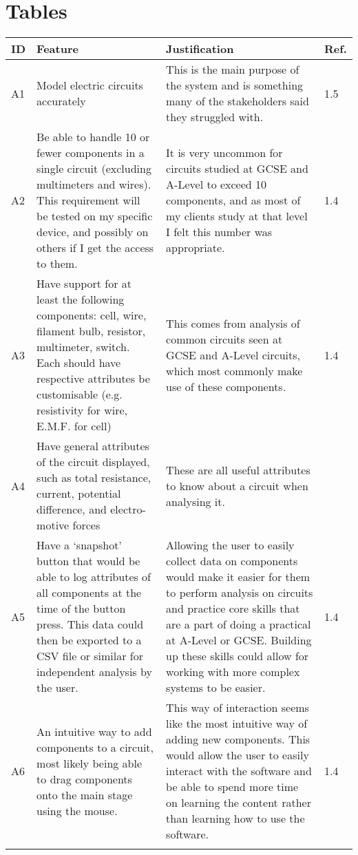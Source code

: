 \chapter{Tables}

\begin{table}[!ht]
    \centering
    \footnotesize
    \begin{tabular}{@{}lp{185pt}p{200pt}l@{}} \toprule
        \textbf{ID} & \textbf{Feature} & \textbf{Justification} & \textbf{Ref.} \\ \midrule
        A1 & Model electric circuits accurately & This is the main purpose of the system and is something many of the stakeholders said they struggled with. & 1.5 \\ \medskip
        A2 & Be able to handle 10 or fewer components in a single circuit (excluding multimeters and wires). This requirement will be tested on my specific device, and possibly on others if I get the access to them. & It is very uncommon for circuits studied at GCSE and A-Level to exceed 10 components, and as most of my clients study at that level I felt this number was appropriate. & 1.4 \\ \medskip
        A3 & Have support for at least the following components: cell, wire, filament bulb, resistor, multimeter, switch. Each should have respective attributes be customisable (e.g. resistivity for wire, E.M.F. for cell) & This comes from analysis of common circuits seen at GCSE and A-Level circuits, which most commonly make use of these components. & 1.4 \\ \medskip
        A4 & Have general attributes of the circuit displayed, such as total resistance, current, potential difference, and electro-motive forces & These are all useful attributes to know about a circuit when analysing it. &  \\ \medskip
        A5 & Have a `snapshot' button that would be able to log attributes of all components at the time of the button press. This data could then be exported to a CSV file or similar for independent analysis by the user. & Allowing the user to easily collect data on components would make it easier for them to perform analysis on circuits and practice core skills that are a part of doing a practical at A-Level or GCSE. Building up these skills could allow for working with more complex systems to be easier. & 1.4 \\ \medskip
        A6 & An intuitive way to add components to a circuit, most likely being able to drag components onto the main stage using the mouse. & This way of interaction seems like the most intuitive way of adding new components. This would allow the user to easily interact with the software and be able to spend more time on learning the content rather than learning how to use the software. & 1.4 \\ \medskip

\end{tabular}
\end{table}
